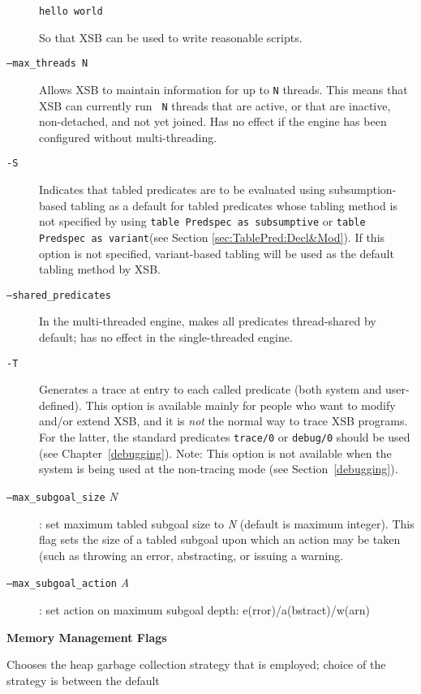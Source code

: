 \begin{description}
\begin{description}
\begin{verbatim}
hello world
\end{verbatim}
So that XSB can be used to write reasonable scripts.
\item[{\tt --max\_threads N}] Allows XSB to maintain information for
  up to {\tt N} threads.  This means that XSB can currently run {\tt
    N} threads that are active, or that are inactive, non-detached,
  and not yet joined.  Has no effect if the engine has been configured
  without multi-threading.
\item[{\tt -S}] Indicates that tabled predicates are to be evaluated
  using subsumption-based tabling as a default for tabled predicates
  whose tabling method is not specified by using {\tt table Predspec
    as subsumptive} or {\tt table Predspec as variant}(see Section
  \ref{sec:TablePred:Decl&Mod}).  If this option is not specified,
  variant-based tabling will be used as the default tabling method by
  XSB\@.  
\item[{\tt --shared\_predicates}] In the multi-threaded engine, makes
    all predicates thread-shared by default; has no effect in the
    single-threaded engine.
%
\item[{\tt -T}] Generates a trace at entry to each called predicate
    (both system and user-defined).  This option is available mainly
    for people who want to modify and/or extend XSB, and it is
    {\em not\/} the normal way to trace XSB programs.  For the
    latter, the standard predicates {\tt trace/0} or {\tt debug/0}
    should be used (see Chapter~\ref{debugging}).
    Note: This option is not available when the system is being used
    at the non-tracing mode (see Section~\ref{debugging}).
%
\item[{\tt --max\_subgoal\_size} {\em N}] : set maximum tabled subgoal
  size to {\em N} (default is maximum integer).  This flag sets the
  size of a tabled subgoal upon which an action may be taken (such as
  throwing an error, abstracting, or issuing a warning.
%
\item[{\tt --max\_subgoal\_action} {\em A}] : set action on maximum
  subgoal depth: e(rror)/a(bstract)/w(arn)
\end{description}
%
\item {\bf Memory Management Flags}
\begin{description}
\item[{\tt -g gc\_type}] Chooses the heap garbage collection strategy
  that is employed; choice of the strategy is between the default {\tt
}
\end{description}
\end{description}
